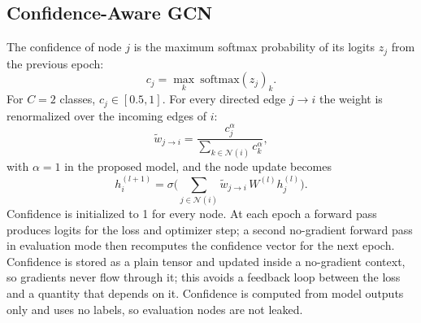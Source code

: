 \documentclass[conference]{IEEEtran}
\begin{document}
\subsection{Confidence-Aware GCN}
The confidence of node $j$ is the maximum softmax probability of its logits $z_j$ from the previous epoch:
\begin{equation}
c_j=\max_k\ \mathrm{softmax}(z_j)_k .
\label{eq:conf}
\end{equation}
For $C=2$ classes, $c_j\in[0.5,1]$. For every directed edge $j\rightarrow i$ the weight is renormalized over the incoming edges of $i$:
\begin{equation}
\tilde w_{j\rightarrow i}=\frac{c_j^{\alpha}}{\sum_{k\in\mathcal{N}(i)}c_k^{\alpha}},
\label{eq:weight}
\end{equation}
with $\alpha=1$ in the proposed model, and the node update becomes
\begin{equation}
h_i^{(l+1)}=\sigma\Big(\sum_{j\in\mathcal{N}(i)}\tilde w_{j\rightarrow i}\,W^{(l)}h_j^{(l)}\Big).
\label{eq:confupdate}
\end{equation}
Confidence is initialized to 1 for every node. At each epoch a forward pass produces logits for the loss and optimizer step; a second no-gradient forward pass in evaluation mode then recomputes the confidence vector for the next epoch. Confidence is stored as a plain tensor and updated inside a no-gradient context, so gradients never flow through it; this avoids a feedback loop between the loss and a quantity that depends on it. Confidence is computed from model outputs only and uses no labels, so evaluation nodes are not leaked.

\begin{table}[t]
\caption{Configuration of baseline and confidence-aware models}
\label{tab:config}
\centering
{}
\end{table}
\end{document}
